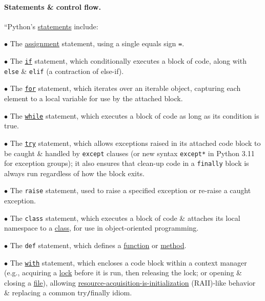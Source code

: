 \documentclass{article}
\numberwithin{equation}{section}
\begin{document}
\paragraph{Statements \& control flow.} ``Python's \href{https://en.wikipedia.org/wiki/Statement_(computer_science)}{statements} include:
\begin{enumerate*}
	\item[$\bullet$] The \href{https://en.wikipedia.org/wiki/Assignment_(computer_science)}{assignment} statement, using a single equals sign \texttt{=}.
	\item[$\bullet$] The \href{https://en.wikipedia.org/wiki/If-then-else}{\texttt{if}} statement, which conditionally executes a block of code, along with \texttt{else} \& \texttt{elif} (a contraction of else-if).
	\item[$\bullet$] The \href{https://en.wikipedia.org/wiki/Foreach#Python}{\texttt{for}} statement, which iterates over an iterable object, capturing each element to a local variable for use by the attached block.
	\item[$\bullet$] The \href{https://en.wikipedia.org/wiki/While_loop#Python}{\texttt{while}} statement, which executes a block of code as long as its condition is true.
	\item[$\bullet$] The \href{https://en.wikipedia.org/wiki/Exception_handling_syntax#Python}{\texttt{try}} statement, which allows exceptions raised in its attached code block to be caught \& handled by \texttt{except} clauses (or new syntax \texttt{except*} in Python 3.11 for exception groups); it also ensures that clean-up code in a \texttt{finally} block is always run regardless of how the block exits.
	\item[$\bullet$] The \texttt{raise} statement, used to raise a specified exception or re-raise a caught exception.
	\item[$\bullet$] The \texttt{class} statement, which executes a block of code \& attaches its local namespace to a \href{https://en.wikipedia.org/wiki/Class_(computer_science)}{class}, for use in object-oriented programming.
	\item[$\bullet$] The \texttt{def} statement, which defines a \href{https://en.wikipedia.org/wiki/Function_(computing)}{function} or \href{https://en.wikipedia.org/wiki/Method_(computing)}{method}.
	\item[$\bullet$] The \href{https://en.wikipedia.org/wiki/Dispose_pattern#Language_constructs}{\texttt{with}} statement, which encloses a code block within a context manager (e.g., acquiring a \href{https://en.wikipedia.org/wiki/Lock_(computer_science)}{lock} before it is run, then releasing the lock; or opening \& closing a \href{https://en.wikipedia.org/wiki/Computer_file}{file}), allowing \href{https://en.wikipedia.org/wiki/Resource_acquisition_is_initialization}{resource-acquisition-is-initialization} (RAII)-like behavior \& replacing a common try\texttt{/}finally idiom.

\end{enumerate*}
\end{document}
